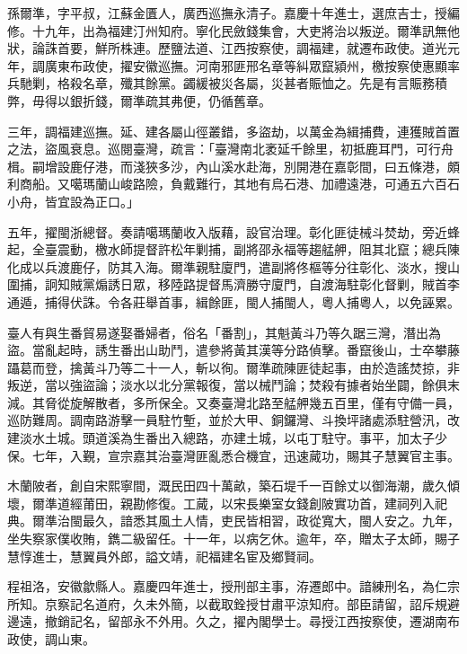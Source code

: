 \begin{pinyinscope}
孫爾準，字平叔，江蘇金匱人，廣西巡撫永清子。嘉慶十年進士，選庶吉士，授編修。十九年，出為福建汀州知府。寧化民斂錢集會，大吏將治以叛逆。爾準訊無他狀，論誅首要，鮮所株連。歷鹽法道、江西按察使，調福建，就遷布政使。道光元年，調廣東布政使，擢安徽巡撫。河南邪匪邢名章等糾眾竄潁州，檄按察使惠顯率兵馳剿，格殺名章，殲其餘黨。蠲緩被災各屬，災甚者賑恤之。先是有言賑務積弊，毋得以銀折錢，爾準疏其弗便，仍循舊章。

三年，調福建巡撫。延、建各屬山徑叢錯，多盜劫，以萬金為緝捕費，連獲賊首置之法，盜風衰息。巡閱臺灣，疏言：「臺灣南北袤延千餘里，初抵鹿耳門，可行舟楫。嗣增設鹿仔港，而淺狹多沙，內山溪水赴海，別開港在嘉彰間，曰五條港，頗利商船。又噶瑪蘭山峻路險，負戴難行，其地有烏石港、加禮遠港，可通五六百石小舟，皆宜設為正口。」

五年，擢閩浙總督。奏請噶瑪蘭收入版藉，設官治理。彰化匪徒械斗焚劫，旁近蜂起，全臺震動，檄水師提督許松年剿捕，副將邵永福等趨艋舺，阻其北竄；總兵陳化成以兵渡鹿仔，防其入海。爾準親駐廈門，遣副將佟樞等分往彰化、淡水，搜山圍捕，詗知賊黨煽誘日眾，移陸路提督馬濟勝守廈門，自渡海駐彰化督剿，賊首李通遁，捕得伏誅。令各莊舉首事，緝餘匪，閩人捕閩人，粵人捕粵人，以免誣累。

臺人有與生番貿易遂娶番婦者，俗名「番割」，其魁黃斗乃等久踞三灣，潛出為盜。當亂起時，誘生番出山助鬥，遣參將黃其漢等分路偵擊。番竄後山，士卒攀藤躡葛而登，擒黃斗乃等二十一人，斬以徇。爾準疏陳匪徒起事，由於造謠焚掠，非叛逆，當以強盜論；淡水以北分黨報復，當以械鬥論；焚殺有據者始坐闢，餘俱末減。其脅從旋解散者，多所保全。又奏臺灣北路至艋舺幾五百里，僅有守備一員，巡防難周。調南路游擊一員駐竹塹，並於大甲、銅鑼灣、斗換坪諸處添駐營汛，改建淡水土城。頭道溪為生番出入總路，亦建土城，以屯丁駐守。事平，加太子少保。七年，入覲，宣宗嘉其治臺灣匪亂悉合機宜，迅速蕆功，賜其子慧翼官主事。

木蘭陂者，創自宋熙寧間，溉民田四十萬畝，築石堤千一百餘丈以御海潮，歲久傾壞，爾準道經莆田，親勘修復。工蕆，以宋長樂室女錢創陂實功首，建祠列入祀典。爾準治閩最久，諳悉其風土人情，吏民皆相習，政從寬大，閩人安之。九年，坐失察家僕收賄，鐫二級留任。十一年，以病乞休。逾年，卒，贈太子太師，賜子慧惇進士，慧翼員外郎，謚文靖，祀福建名宦及鄉賢祠。

程祖洛，安徽歙縣人。嘉慶四年進士，授刑部主事，洊遷郎中。諳練刑名，為仁宗所知。京察記名道府，久未外簡，以截取銓授甘肅平涼知府。部臣請留，詔斥規避邊遠，撤銷記名，留部永不外用。久之，擢內閣學士。尋授江西按察使，遷湖南布政使，調山東。


\end{pinyinscope}
